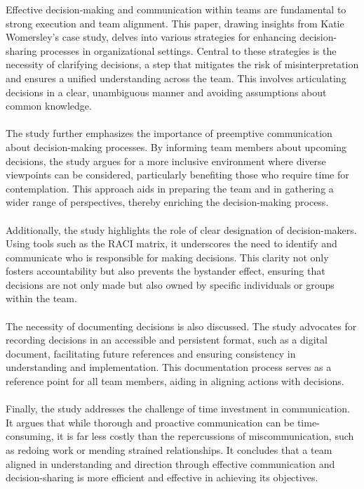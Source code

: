 \documentclass[12pt]{article}
\begin{document}
Effective decision-making and communication within teams are fundamental to strong execution and team alignment. This paper, drawing insights from Katie Womersley's case study, delves into various strategies for enhancing decision-sharing processes in organizational settings. Central to these strategies is the necessity of clarifying decisions, a step that mitigates the risk of misinterpretation and ensures a unified understanding across the team. This involves articulating decisions in a clear, unambiguous manner and avoiding assumptions about common knowledge.\\
\\The study further emphasizes the importance of preemptive communication about decision-making processes. By informing team members about upcoming decisions, the study argues for a more inclusive environment where diverse viewpoints can be considered, particularly benefiting those who require time for contemplation. This approach aids in preparing the team and in gathering a wider range of perspectives, thereby enriching the decision-making process.\\
\\Additionally, the study highlights the role of clear designation of decision-makers. Using tools such as the RACI matrix, it underscores the need to identify and communicate who is responsible for making decisions. This clarity not only fosters accountability but also prevents the bystander effect, ensuring that decisions are not only made but also owned by specific individuals or groups within the team.\\
\\The necessity of documenting decisions is also discussed. The study advocates for recording decisions in an accessible and persistent format, such as a digital document, facilitating future references and ensuring consistency in understanding and implementation. This documentation process serves as a reference point for all team members, aiding in aligning actions with decisions.\\
\\Finally, the study addresses the challenge of time investment in communication. It argues that while thorough and proactive communication can be time-consuming, it is far less costly than the repercussions of miscommunication, such as redoing work or mending strained relationships. It concludes that a team aligned in understanding and direction through effective communication and decision-sharing is more efficient and effective in achieving its objectives.\\
\end{document}
